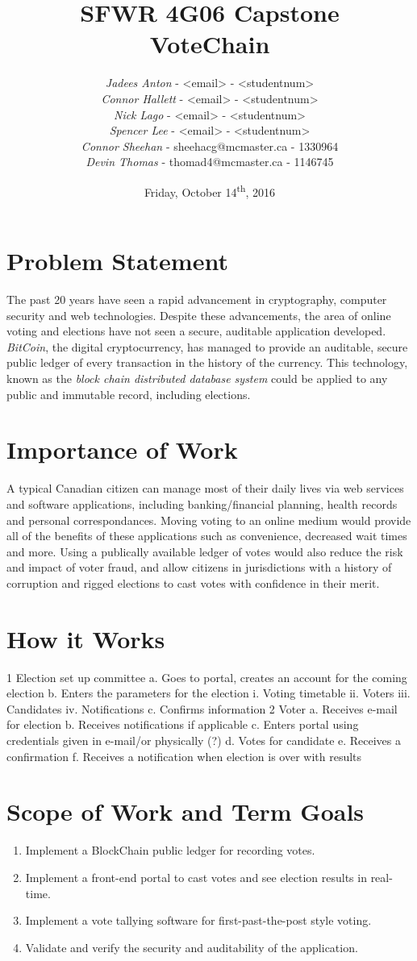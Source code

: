 \documentclass[titlepage]{article}
\title{\Huge{\textbf{
SFWR 4G06 Capstone\\VoteChain
}}\vspace{8cm}}
\author{\textit{Jadees Anton} - <email> - <studentnum>\\
\textit{Connor Hallett} - <email> - <studentnum>\\
\textit{Nick Lago} - <email> - <studentnum>\\
\textit{Spencer Lee} - <email> - <studentnum>\\
\textit{Connor Sheehan} - sheehacg@mcmaster.ca - 1330964\\
\textit{Devin Thomas} - thomad4@mcmaster.ca - 1146745\\
}
\date{Friday, October 14\textsuperscript{th}, 2016}
\begin{document}
\maketitle

\section{Problem Statement}
The past 20 years have seen a rapid advancement in cryptography, computer security and web technologies. Despite these advancements, the area of online voting and elections have not seen a secure, auditable application developed. \textit{BitCoin}, the digital cryptocurrency, has managed to provide an auditable, secure public ledger of every transaction in the history of the currency. This technology, known as the \textit{block chain distributed database system} could be applied to any public and immutable record, including elections.

\section{Importance of Work}
A typical Canadian citizen can manage most of their daily lives via web services and software applications, including banking/financial planning, health records and personal correspondances. Moving voting to an online medium would provide all of the benefits of these applications such as convenience, decreased wait times and more. Using a publically available ledger of votes would also reduce the risk and impact of voter fraud, and allow citizens in jurisdictions with a history of corruption and rigged elections to cast votes with confidence in their merit.

\section{How it Works}
1	Election set up committee
  a.	Goes to portal, creates an account for the coming election
  b.	Enters the parameters for the election
    i.	Voting timetable
    ii.	Voters
    iii.	Candidates
    iv.	Notifications
  c.	Confirms information
2	Voter
  a.	Receives e-mail for election
  b.	Receives notifications if applicable 
  c.	Enters portal using credentials given in e-mail/or physically (?)
  d.	Votes for candidate
  e.	Receives a confirmation
  f.	Receives a notification when election is over with results


\section{Scope of Work and Term Goals}
\begin{enumerate}
\item Implement a BlockChain public ledger for recording votes.
\item Implement a front-end portal to cast votes and see election results in real-time.
\item Implement a vote tallying software for first-past-the-post style voting.
\item Validate and verify the security and auditability of the application.
\end{enumerate}
\end{document}
